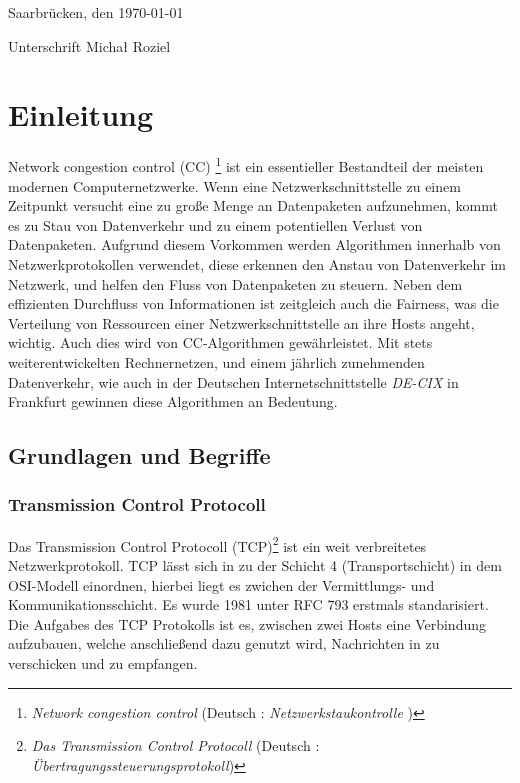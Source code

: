 \documentclass[paper=a4,fontsize=12pt,ngerman]{scrartcl}
\begin{document}
Saarbrücken, den \today

\smallskip
Unterschrift  Micha\l{} Roziel




\clearpage
\tableofcontents 

\clearpage
{}



\section{Einleitung}

Network congestion control (CC)  \footnote{\textit{Network congestion control} (Deutsch : \textit{ Netzwerkstaukontrolle }) } ist ein essentieller Bestandteil der 
meisten modernen Computernetzwerke. 
Wenn eine Netzwerkschnittstelle zu einem Zeitpunkt versucht eine zu große Menge an Datenpaketen aufzunehmen,
kommt es zu Stau von Datenverkehr und zu einem potentiellen Verlust von Datenpaketen.
Aufgrund diesem Vorkommen werden Algorithmen innerhalb von Netzwerkprotokollen verwendet, diese erkennen den Anstau von Datenverkehr im Netzwerk,
und helfen den Fluss von Datenpaketen zu steuern. Neben dem effizienten Durchfluss von Informationen ist zeitgleich auch die Fairness, 
was die Verteilung von Ressourcen einer Netzwerkschnittstelle an ihre Hosts angeht, wichtig. Auch dies wird von CC-Algorithmen gewährleistet.
\newline
Mit stets weiterentwickelten Rechnernetzen, und einem jährlich zunehmenden Datenverkehr, wie auch in der Deutschen Internetschnittstelle
\textit{DE-CIX}\cite{DE-CIX2025} in Frankfurt gewinnen diese Algorithmen an Bedeutung. 





\subsection{Grundlagen und Begriffe}

\subsubsection{Transmission Control Protocoll}

Das Transmission Control Protocoll (TCP)\footnote{\textit{Das Transmission Control Protocoll} (Deutsch : \textit{Übertragungssteuerungsprotokoll})} ist ein weit verbreitetes Netzwerkprotokoll. 
TCP lässt sich in zu der Schicht 4 (Transportschicht) in dem OSI-Modell einordnen, hierbei liegt es zwichen der Vermittlungs- und Kommunikationsschicht.
\newline Es wurde 1981 unter RFC 793 erstmals standarisiert. \cite{rfc793}   %
Die Aufgabes des TCP Protokolls ist es, zwischen zwei Hosts eine Verbindung aufzubauen, welche anschließend dazu genutzt wird,  
Nachrichten in zu verschicken und zu empfangen.
\end{document}
